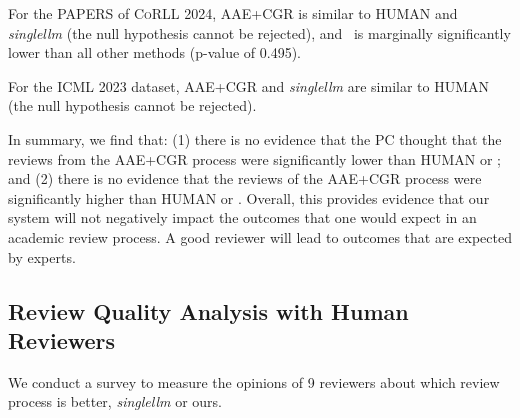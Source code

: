 \documentclass{article} %
\begin{document}
For the PAPERS of \textsc{CoRLL 2024}, AAE+CGR is similar to HUMAN and \textit{singlellm} (the null hypothesis cannot be rejected), and \reviewergpt\ is marginally significantly lower than all other methods (p-value of 0.495).

For the \textsc{ICML 2023} dataset, AAE+CGR and \textit{singlellm} are similar to HUMAN (the null hypothesis cannot be rejected).

In summary, we find that: (1) there is no evidence that the PC thought that the reviews from the AAE+CGR process were significantly lower than HUMAN or \singlellm; and (2) there is no evidence that the reviews of the AAE+CGR process were significantly higher than HUMAN or \singlellm. 
Overall, this provides evidence that our system will not negatively impact the outcomes that one would expect in an academic review process. 
A good reviewer will lead to outcomes that are expected by experts. 
\subsection{Review Quality Analysis with Human Reviewers}

We conduct a survey to measure the opinions of 9 reviewers about which review process is better, \textit{singlellm} or ours. 
\end{document}
